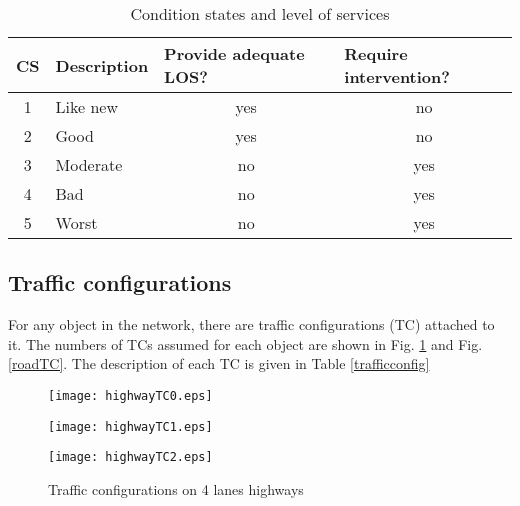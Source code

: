 \documentclass[a4paper,3p,times,authoryear]{elsarticle}
\begin{document}
\begin{table}[H]
	\centering
	\caption{Condition states and level of services} \label{tbl:ex1}
\begin{tabular}{|l|l|l|l|}
\hline
\multicolumn{1}{|c|}{CS} & Description & \multicolumn{1}{m{15mm}|}{\centering Provide adequate LOS?} & \multicolumn{1}{m{20mm}|}{\centering Require intervention?} \\ 
\hline
\multicolumn{1}{|c|}{1} & Like new & \multicolumn{1}{c|}{yes} & \multicolumn{1}{c|}{no} \\ 
\hline
\multicolumn{1}{|c|}{2} & Good & \multicolumn{1}{c|}{yes} & \multicolumn{1}{c|}{no} \\ 
\hline
\multicolumn{1}{|c|}{3} & Moderate & \multicolumn{1}{c|}{no} & \multicolumn{1}{c|}{yes} \\ 
\hline
\multicolumn{1}{|c|}{4} & Bad & \multicolumn{1}{c|}{no} & \multicolumn{1}{c|}{yes}  \\ 
\hline
\multicolumn{1}{|c|}{5} & Worst & \multicolumn{1}{c|}{no} & \multicolumn{1}{c|}{yes} \\ 
\hline
\end{tabular}
\end{table}
%

\subsection{Traffic configurations}
For any object in the network, there are traffic configurations (TC) attached to it. The numbers of TCs assumed for each object are shown in Fig. \ref{highwayTC} and Fig. \ref{roadTC}. The description of each TC is given in Table \ref{trafficconfig}

\begin{figure}[h]
\centering
 \begin{minipage}[h]{0.2\linewidth}
        \centering
        \texttt{[image: highwayTC0.eps]}
				\label{highwayTC0}
     \end{minipage}
\vspace{3.00mm}
    \begin{minipage}[h]{0.2\linewidth}
       \centering
       \texttt{[image: highwayTC1.eps]}
			\label{highwayTC1}
     \end{minipage}
\vspace{3.00mm} 
    \begin{minipage}[h]{0.2\linewidth}
        \centering
        \texttt{[image: highwayTC2.eps]}
				\label{highwayTC2}
     \end{minipage}
\caption{Traffic configurations on 4 lanes highways}
\label{highwayTC}
\end{figure}
\end{document}
